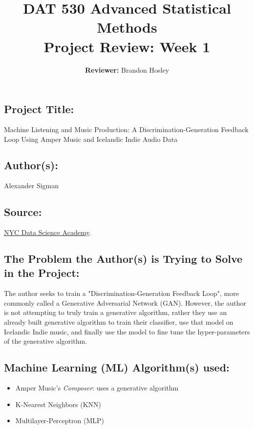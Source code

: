\documentclass[]{article}
\title{\textbf{DAT 530 Advanced Statistical Methods}\\
	\normalsize{Project Review: Week 1} }
\author{\textbf{Reviewer: }
	Brandon Hosley}
\begin{document}
\setlength{\droptitle}{-10em} 
\pretitle{\begin{flushleft}\LARGE} %
	\posttitle{\end{flushleft}}
\preauthor{\begin{flushleft}\large} %
	\postauthor{\end{flushleft}}
\predate{\begin{flushleft}\large} %
	\postdate{\end{flushleft}}
\maketitle

\vspace{-3em}

\subsection*{Project Title:}
Machine Listening and Music Production: A Discrimination-Generation Feedback Loop Using Amper Music and Icelandic Indie Audio Data

\subsection*{Author(s):}
Alexander Sigman

\subsection*{Source:}
\href{https://nycdatascience.com/blog/student-works/machine-listening-and-music-production-a-discrimination-generation-feedback-loop-using-amper-music-and-icelandic-indie-audio-data/}{NYC Data Science Academy}.

\subsection*{The Problem the Author(s) is Trying to Solve in the Project:}
The author seeks to train a "Discrimination-Generation Feedback Loop", more commonly called a Generative Adversarial Network (GAN). However, the author is not attempting to truly train a generative algorithm, rather they use an already built generative algorithm to train their classifier, use that model on Icelandic Indie music, and finally use the model to fine tune the hyper-parameters of the generative algorithm.

\subsection*{Machine Learning (ML) Algorithm(s) used:}
\begin{itemize}
	\item Amper Music's \emph{Composer}: uses a generative algorithm
	\item K-Nearest Neighbors (KNN)
	\item Multilayer-Perceptron (MLP)
\end{itemize}
\end{document}
